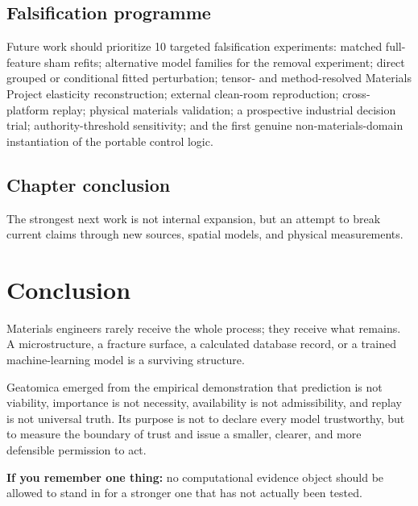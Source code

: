 \documentclass[11pt,a4paper,oneside]{report}
\begin{document}
\section{Falsification programme}
Future work should prioritize 10 targeted falsification experiments: matched full-feature sham refits; alternative model families for the removal experiment; direct grouped or conditional fitted perturbation; tensor- and method-resolved Materials Project elasticity reconstruction; external clean-room reproduction; cross-platform replay; physical materials validation; a prospective industrial decision trial; authority-threshold sensitivity; and the first genuine non-materials-domain instantiation of the portable control logic.

\section{Chapter conclusion}
The strongest next work is not internal expansion, but an attempt to break current claims through new sources, spatial models, and physical measurements.



\clearpage



\chapter*{Conclusion}
\label{chap:conclusion}

Materials engineers rarely receive the whole process; they receive what remains. A microstructure, a fracture surface, a calculated database record, or a trained machine-learning model is a surviving structure.

Geatomica emerged from the empirical demonstration that prediction is not viability, importance is not necessity, availability is not admissibility, and replay is not universal truth. Its purpose is not to declare every model trustworthy, but to measure the boundary of trust and issue a smaller, clearer, and more defensible permission to act.

\textbf{If you remember one thing:} no computational evidence object should be allowed to stand in for a stronger one that has not actually been tested.


\end{document}

